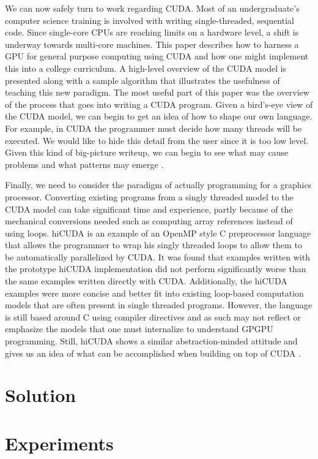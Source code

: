 \documentclass{article}
\begin{document}
We can now safely turn to work regarding CUDA. Most of an undergraduate's computer science training is involved with writing single-threaded, sequential code. Since single-core CPUs are reaching limits on a hardware level, a shift is underway towards multi-core machines. This paper describes how to harness a GPU for general purpose computing using CUDA and how one might implement this into a college curriculum. A high-level overview of the CUDA model is presented along with a sample algorithm that illustrates the usefulness of teaching this new paradigm. The most useful part of this paper was the overview of the process that goes into writing a CUDA program. Given a bird's-eye view of the CUDA model, we can begin to get an idea of how to shape our own language. For example, in CUDA the programmer must decide how many threads will be executed. We would like to hide this detail from the user since it is too low level. Given this kind of big-picture writeup, we can begin to see what may cause problems and what patterns may emerge \cite{tran}.

Finally, we need to consider the paradigm of actually programming for a graphics processor. Converting existing programs from a singly threaded model to the CUDA model can take significant time and experience, partly because of the mechanical conversions needed such as computing array references instead of using loops. hiCUDA is an example of an OpenMP style C preprocessor language that allows the programmer to wrap his singly threaded loops to allow them to be automatically parallelized by CUDA. It was found that examples written with the prototype hiCUDA implementation did not perform significantly worse than the same examples written directly with CUDA. Additionally, the hiCUDA examples were more concise and better fit into existing loop-based computation models that are often present in single threaded programs. However, the language is still based around C using compiler directives and as such may not reflect or emphasize the models that one must internalize to understand GPGPU programming. Still, hiCUDA shows a similar abstraction-minded attitude and gives us an idea of what can be accomplished when building on top of CUDA \cite{han}.

\section{Solution}

\section{Experiments}
\end{document}
